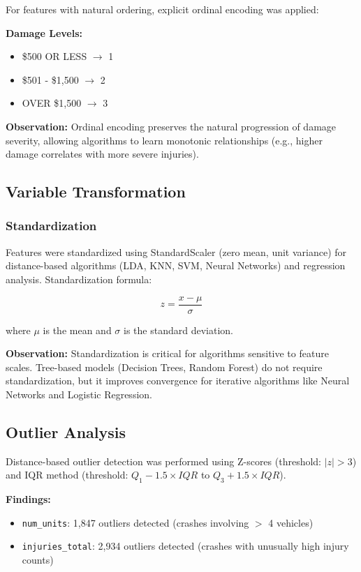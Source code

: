 \documentclass[12pt,man]{apa7}
\begin{document}
For features with natural ordering, explicit ordinal encoding was applied:

\textbf{Damage Levels:}
\begin{itemize}
    \item \$500 OR LESS $\rightarrow$ 1
    \item \$501 - \$1,500 $\rightarrow$ 2
    \item OVER \$1,500 $\rightarrow$ 3
\end{itemize}

\textbf{Observation:} Ordinal encoding preserves the natural progression of damage severity, allowing algorithms to learn monotonic relationships (e.g., higher damage correlates with more severe injuries).

\subsection{Variable Transformation}

\subsubsection{Standardization}

Features were standardized using StandardScaler (zero mean, unit variance) for distance-based algorithms (LDA, KNN, SVM, Neural Networks) and regression analysis. Standardization formula:

\begin{equation}
z = \frac{x - \mu}{\sigma}
\end{equation}

where $\mu$ is the mean and $\sigma$ is the standard deviation.

\textbf{Observation:} Standardization is critical for algorithms sensitive to feature scales. Tree-based models (Decision Trees, Random Forest) do not require standardization, but it improves convergence for iterative algorithms like Neural Networks and Logistic Regression.

\subsection{Outlier Analysis}

Distance-based outlier detection was performed using Z-scores (threshold: $|z| > 3$) and IQR method (threshold: $Q_1 - 1.5 \times IQR$ to $Q_3 + 1.5 \times IQR$).

\textbf{Findings:}
\begin{itemize}
    \item \texttt{num\_units}: 1,847 outliers detected (crashes involving $>$ 4 vehicles)
    \item \texttt{injuries\_total}: 2,934 outliers detected (crashes with unusually high injury counts)
\end{itemize}
\end{document}
